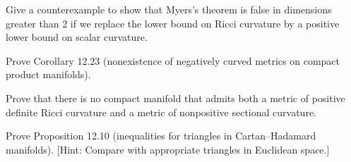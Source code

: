 \begin{exercise}\label{prob:myers-scalar-counterexample}
Give a counterexample to show that Myers's theorem is false in dimensions greater than 2 if we replace the lower bound on Ricci curvature by a positive lower bound on scalar curvature.
\end{exercise}

\begin{exercise}
\label{prob:no-negative-curvature-compact-products}
Prove Corollary 12.23 (nonexistence of negatively curved metrics on compact product manifolds).
\end{exercise}

\begin{exercise}\label{prob:no-positive-negative-ricci}
Prove that there is no compact manifold that admits both a metric of positive definite Ricci curvature and a metric of nonpositive sectional curvature.
\end{exercise}

\begin{exercise}
\label{prob:triangle-inequalities-cartan-hadamard}
Prove Proposition 12.10 (inequalities for triangles in Cartan--Hadamard manifolds). [Hint: Compare with appropriate triangles in Euclidean space.]
\end{exercise}
